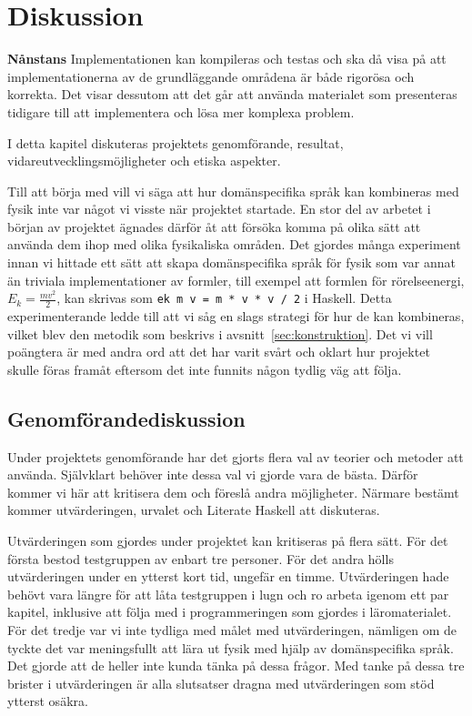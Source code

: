 
\chapter{Diskussion}\label{cha:disk}
\textbf{Nånstans}
Implementationen kan kompileras och testas och ska då visa på att
implementationerna av de grundläggande områdena är både rigorösa och korrekta.
Det visar dessutom att det går att använda materialet som presenteras tidigare
till att implementera och lösa mer komplexa problem.

I detta kapitel diskuteras projektets genomförande, resultat,
vidareutvecklingsmöjligheter och etiska aspekter.

Till att börja med vill vi säga att hur domänspecifika språk kan kombineras med
fysik inte var något vi visste när projektet startade. En stor del av arbetet i
början av projektet ägnades därför åt att försöka komma på olika sätt att
använda dem ihop med olika fysikaliska områden. Det gjordes många experiment
innan vi hittade ett sätt att skapa domänspecifika språk för fysik som var annat än
triviala implementationer av formler, till exempel att formlen för
rörelseenergi, $E_k = \frac{mv^2}{2}$, kan skrivas som \texttt{ek m v = m * v *
v / 2} i Haskell. Detta experimenterande ledde till att
vi såg en slags strategi för hur de kan kombineras, vilket blev den
metodik som beskrivs i avsnitt~\ref{sec:konstruktion}. Det vi vill poängtera är
med andra ord att det har varit svårt och oklart hur projektet skulle föras
framåt eftersom det inte funnits någon tydlig väg att följa.

\section{Genomförandediskussion}

Under projektets genomförande har det gjorts flera val av teorier och metoder att använda. Självklart behöver inte dessa val vi gjorde vara de bästa. Därför kommer vi här att kritisera dem och föreslå andra möjligheter. Närmare bestämt kommer utvärderingen, urvalet och Literate Haskell att diskuteras.

Utvärderingen som gjordes under projektet kan kritiseras på flera sätt. För det första bestod testgruppen av enbart tre personer. För det andra hölls utvärderingen under en ytterst kort tid, ungefär en timme. Utvärderingen hade behövt vara längre för att låta testgruppen i lugn och ro arbeta igenom ett par kapitel, inklusive att följa med i programmeringen som gjordes i läromaterialet. För det tredje var vi inte tydliga med målet med utvärderingen, nämligen om de tyckte det var meningsfullt att lära ut fysik med hjälp av domänspecifika språk. Det gjorde att de heller inte kunda tänka på dessa frågor. Med tanke på dessa tre brister i utvärderingen är alla slutsatser dragna med utvärderingen som stöd ytterst osäkra.

